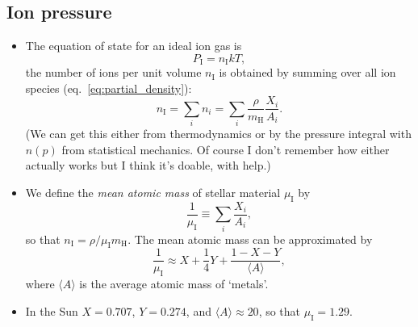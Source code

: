 \documentclass[10pt,amsmath,amssymb,aps,pra]{revtex4-2}
\newcommand{\sub}[1]{_{\text{#1}}}
\newcommand{\mh}{m\sub{H}}
\newcommand{\mean}[1]{\langle{#1}\rangle}
\begin{document}
\subsection{Ion pressure}
\begin{itemize}
\item The equation of state for an ideal ion gas is
\begin{equation}
P\sub{I} = n\sub{I}kT,
\end{equation}
the number of ions per unit volume $n\sub{I}$ is obtained by summing over all
ion species (eq.~\ref{eq:partial_density}):
\begin{equation}
n\sub{I} = \sum_in_i = \sum_i\frac{\rho}{\mh}\frac{X_i}{A_i}.
\end{equation}
(We can get this either from thermodynamics or by the pressure integral with
$n(p)$ from statistical mechanics. Of course I don't remember how either
actually works but I think it's doable, with help.)

\item We define the \emph{mean atomic mass} of stellar material $\mu\sub{I}$ by
\begin{equation}
\frac{1}{\mu\sub{I}}\equiv\sum_i\frac{X_i}{A_i},
\end{equation}
so that $n\sub{I}=\rho/\mu\sub{I}\mh$. The mean atomic mass can be
approximated by
\begin{equation}
\frac{1}{\mu\sub{I}}\approx{X} + \frac{1}{4}Y + \frac{1-X-Y}{\mean{A}},
\end{equation}
where $\mean{A}$ is the average atomic mass of `metals'.

\item In the Sun $X=0.707$, $Y=0.274$, and $\mean{A}\approx{20}$, so that
$\mu\sub{I}={1.29}$.
\end{itemize}
\end{document}
